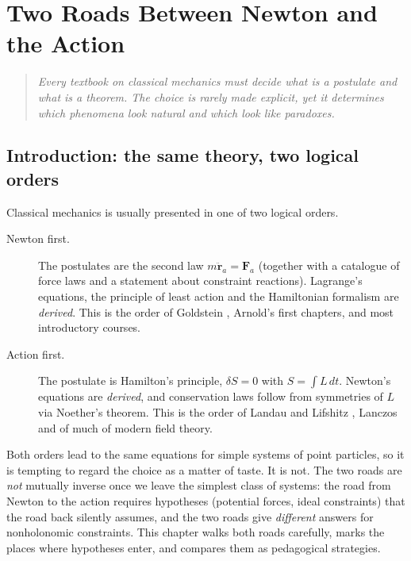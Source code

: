 \chapter{Two Roads Between Newton and the Action}
\label{two-roads}

\begin{quote}\itshape
Every textbook on classical mechanics must decide what is a postulate and
what is a theorem. The choice is rarely made explicit, yet it determines which
phenomena look natural and which look like paradoxes.
\end{quote}

\section{Introduction: the same theory, two logical orders}
\label{two-orders}

Classical mechanics is usually presented in one of two logical orders.

\begin{description}
  \item[Newton first.] The postulates are the second law
  $m\ddot{\mathbf r}_a=\mathbf F_a$ (together with a catalogue of force laws
  and a statement about constraint reactions). Lagrange's equations, the
  principle of least action and the Hamiltonian formalism are \emph{derived}.
  This is the order of Goldstein \cite{Goldstein}, Arnold's \cite{Arnold-cm} first chapters, and most
  introductory courses.
  \item[Action first.] The postulate is Hamilton's principle,
  $\delta S=0$ with $S=\int L\,dt$. Newton's equations are \emph{derived}, and
  conservation laws follow from symmetries of $L$ via Noether's theorem. This
  is the order of Landau and Lifshitz \cite{Landau-Lifshitz-1}, 
        Lanczos \cite{Lanczos} and of much of modern field theory.
\end{description}

Both orders lead to the same equations for simple systems of point particles, 
so it is
tempting to regard the choice as a matter of taste. It is not. The two roads
are \emph{not} mutually inverse once we leave the simplest class of systems:
the road from Newton to the action requires hypotheses (potential forces,
ideal constraints) that the road back silently assumes, and the two roads give
\emph{different} answers for nonholonomic constraints. This chapter walks both
roads carefully, marks the places where hypotheses enter, and compares them
as pedagogical strategies.

